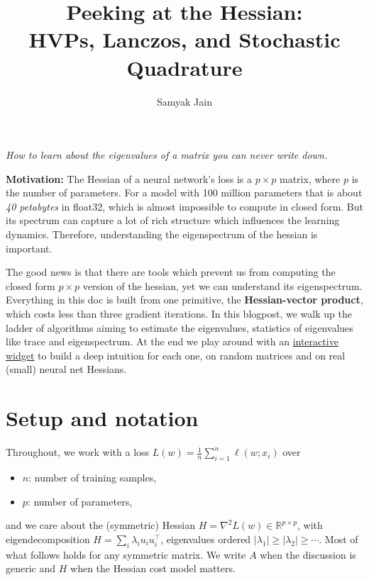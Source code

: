 \documentclass[11pt]{article}
\title{Peeking at the Hessian:\\ HVPs, Lanczos, and Stochastic Quadrature}
\author{Samyak Jain}
\date{}
\newcommand{\lab}{\href{https://samyakjainberk.github.io/hessian-spectral/}{interactive widget}}
\begin{document}
\maketitle

\begin{center}
\emph{How to learn about the eigenvalues of a matrix you can never write down.}
\end{center}

\medskip

\textbf{Motivation:} The Hessian of a neural network's loss is a $p \times p$ matrix, where $p$ is the number of parameters. For a model with 100 million parameters that is about \emph{40 petabytes} in float32, which is almost impossible to compute in closed form. But its spectrum can capture a lot of rich structure which influences the learning dynamics. Therefore, understanding the eigenspectrum of the hessian is important.

The good news is that there are tools which prevent us from computing the closed form $p \times p$ version of the hessian, yet we can understand its eigenspectrum. Everything in this doc is built from one primitive, the \textbf{Hessian-vector product}, which costs less than three gradient iterations. In this blogpost, we walk up the ladder of algorithms aiming to estimate the eigenvalues, statistics of eigenvalues like trace and eigenspectrum. At the end we play around with an \lab{} to build a deep intuition for each one, on random matrices and on real (small) neural net Hessians.

\tableofcontents

\section{Setup and notation}

Throughout, we work with a loss $L(w) = \frac{1}{n}\sum_{i=1}^n \ell(w; x_i)$ over
\begin{itemize}
  \item $n$: number of training samples,
  \item $p$: number of parameters,
\end{itemize}
and we care about the (symmetric) Hessian $H = \nabla^2 L(w) \in \mathbb{R}^{p\times p}$, with eigendecomposition $H = \sum_i \lambda_i u_i u_i^\top$, eigenvalues ordered $|\lambda_1| \ge |\lambda_2| \ge \cdots$. Most of what follows holds for any symmetric matrix. We write $A$ when the discussion is generic and $H$ when the Hessian cost model matters.
\end{document}
